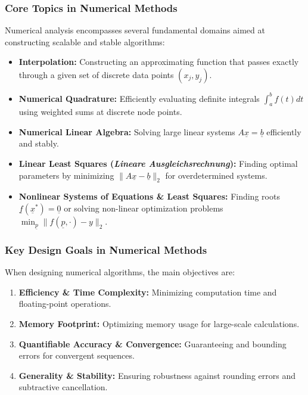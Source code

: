\subsubsection{Core Topics in Numerical Methods}

Numerical analysis encompasses several fundamental domains aimed at constructing scalable and stable algorithms:

\begin{itemize}
    \item \textbf{Interpolation:} Constructing an approximating function that passes exactly through a given set of discrete data points $(x_j, y_j)$.
    \item \textbf{Numerical Quadrature:} Efficiently evaluating definite integrals $\int_a^b f(t) dt$ using weighted sums at discrete node points.
    \item \textbf{Numerical Linear Algebra:} Solving large linear systems $A\underline{x} = \underline{b}$ efficiently and stably.
    \item \textbf{Linear Least Squares (\textit{Lineare Ausgleichsrechnung}):} Finding optimal parameters by minimizing $\|A\underline{x} - \underline{b}\|_2$ for overdetermined systems.
    \item \textbf{Nonlinear Systems of Equations \& Least Squares:} Finding roots $\underline{f}(\underline{x}^*) = \underline{0}$ or solving non-linear optimization problems $\min_{\underline{p}} \|f(\underline{p}, \cdot) - y\|_2$.
\end{itemize}

\subsubsection{Key Design Goals in Numerical Methods}

When designing numerical algorithms, the main objectives are:
\begin{enumerate}
    \item \textbf{Efficiency \& Time Complexity:} Minimizing computation time and floating-point operations.
    \item \textbf{Memory Footprint:} Optimizing memory usage for large-scale calculations.
    \item \textbf{Quantifiable Accuracy \& Convergence:} Guaranteeing and bounding errors for convergent sequences.
    \item \textbf{Generality \& Stability:} Ensuring robustness against rounding errors and subtractive cancellation.
\end{enumerate}

